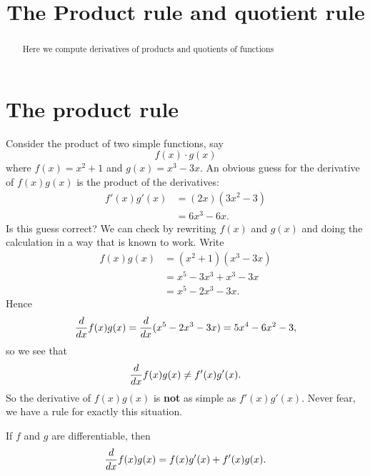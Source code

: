 \documentclass{ximera}
\title[Dig-In:]{The Product rule and quotient rule}
\begin{document}
\begin{abstract}
Here we compute derivatives of products and quotients of functions
\end{abstract}
\maketitle


\section{The product rule}


Consider the product of two simple functions, say
\[
f(x)\cdot g(x)
\]
where $f(x)=x^2+1$ and $g(x)=x^3-3x$. An obvious guess for the
derivative of $f(x)g(x)$ is the product of the derivatives:
\begin{align*}
f'(x)g'(x) &= (2x)(3x^2-3)\\
&= 6x^3-6x.
\end{align*}
Is this guess correct? We can check by rewriting $f(x)$
and $g(x)$ and doing the calculation in a way that is known to
work. Write 
\begin{align*}
f(x)g(x) &= (x^2+1)(x^3-3x)\\
&=x^5-3x^3+x^3-3x\\
&=x^5-2x^3-3x.
\end{align*} 
Hence
\[
\frac{d}{dx} f(x) g(x) = \frac{d}{dx}(x^5 - 2x^3 - 3x) = 5x^4-6x^2-3, 
\]
so we see that 
\[
\frac{d}{dx} f(x) g(x) \ne  f'(x)g'(x).
\]
So the derivative of $f(x)g(x)$ is \textbf{not} as simple as
$f'(x)g'(x)$. Never fear, we have a rule for exactly this
situation.
\begin{theorem}\label{theorem:product-rule}
If $f$ and $g$ are differentiable, then
\[
\frac{d}{dx} f(x)g(x) = f(x)g'(x)+f'(x)g(x).
\]
\end{theorem}

\end{document}

